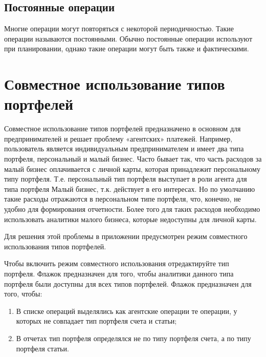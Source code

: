 \documentclass[a4paper,10pt,russian]{sphinxmanual}
\begin{document}
\section{Постоянные операции}
\label{\detokenize{transactions:id6}}
\sphinxAtStartPar
Многие операции могут повторяться с некоторой периодичностью. Такие операции называются постоянными. Обычно постоянные
операции используют при планировании, однако такие операции могут быть также и фактическими.

\noindent{}
\noindent{}
\noindent{}
\noindent{}

\sphinxstepscope


\chapter{Совместное использование типов портфелей}
\label{\detokenize{shared-transactions:chapter-shared-transactions}}\label{\detokenize{shared-transactions:id1}}\label{\detokenize{shared-transactions::doc}}
\sphinxAtStartPar
Совместное использование типов портфелей предназначено в основном для предпринимателей
и решает проблему «агентских» платежей. Например, пользователь является
индивидуальным предпринимателем и имеет два типа портфеля, персональный и малый бизнес.
Часто бывает так, что часть расходов за малый бизнес оплачивается с личной
карты, которая принадлежит персональному типу портфеля. Т.е. персональный тип портфеля
выступает в роли агента для типа портфеля Малый бизнес, т.к. действует в его интересах.
Но по умолчанию такие расходы отражаются в персональном типе портфеля, что, конечно,
не удобно для формирования отчетности. Более того для таких расходов необходимо
использовать аналитики малого бизнеса, которые недоступны для личной карты.

\sphinxAtStartPar
Для решения этой проблемы в приложении предусмотрен режим совместного использования типов
портфелей.

\sphinxAtStartPar
Чтобы включить режим совместного использования отредактируйте тип портфеля.
Флажок  предназначен для того, чтобы аналитики данного типа портфеля
были доступны для всех типов портфелей.
Флажок  предназначен для того, чтобы:
\begin{enumerate}
%
\item {} 
\sphinxAtStartPar
В списке операций выделялись как агентские операции те операции, у которых не совпадает тип портфеля счета и статьи;

\item {} 
\sphinxAtStartPar
В отчетах тип портфеля определялся не по типу портфеля счета, а по типу портфеля статьи.

\end{enumerate}
\end{document}
